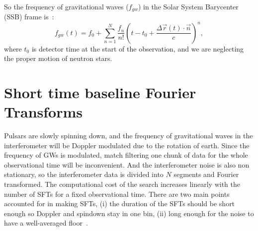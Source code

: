 \documentclass{ttuthes2007}
\begin{document}
So the frequency of gravitational waves ($f_{gw}$) in the Solar System Barycenter
(SSB) frame is~\cite{Krishnan_2004}:
\begin{equation}
f_{gw}(t) = f_0 + \sum_{n=1}^{N} \frac{f_n}{n!}\left(t - t_0 + \frac{\Delta
\vec{r}(t)\cdot \vec{n}}{c}\right)^n,
\end{equation}
where $t_0$ is detector time at the start of the observation, and we are
neglecting the proper motion of neutron stars. 

\section{Short time baseline Fourier Transforms}
Pulsars are slowly spinning down, and the frequency of gravitational waves
in the interferometer will be Doppler modulated due to the rotation of earth.
Since the frequency of \acp{GW} is modulated, match filtering one chunk of
data for the whole observational time will be inconvenient. And the
interferometer noise is also non stationary, so the interferometer data is 
divided into $N$ segments and Fourier transformed. The computational cost of the
search increases linearly with the number of \acp{SFT} for a fixed observational
time. There are two main points accounted for in making \acp{SFT}, (i) the
duration of the
\acp{SFT} should be short enough so Doppler and spindown stay in one bin, (ii)
long enough for the noise to have a well-averaged floor~\cite{Krishnan_2004,Abbott_2007}. 
\end{document}
